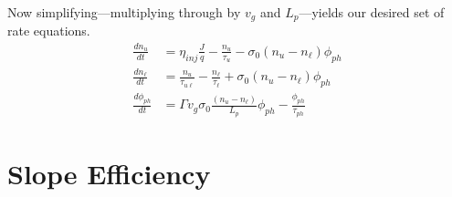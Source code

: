 \documentclass[12pt]{report}
\begin{document}
Now simplifying---multiplying through by $v_g$ and $L_p$---yields our desired set of rate equations.
\begin{subequations}
\label{chpt1eqn:req}
\begin{align}
\label{chpt1eqn:reqA}
\frac{d n_u}{dt}&=\eta_\textit{inj} \frac{J}{q}- \frac{n_u}{\tau_u}-\sigma_0 (n_u-n_\ell) \phi_{ph}\\
\label{chpt1eqn:reqB}
\frac{d n_\ell}{dt}&=\frac{n_u}{\tau_{u\ell}}- \frac{n_\ell}{\tau_\ell}+\sigma_0 (n_u-n_\ell) \phi_{ph}\\
\label{chpt1eqn:reqC}
\frac{d \phi_{ph}}{dt}&=\Gamma v_g \sigma_0 \frac{(n_u-n_\ell)}{L_p} \phi_{ph} - \frac{\phi_{ph}}{\tau_{ph}}
\end{align}
\end{subequations}


%
%
%
%
%

\section{Slope Efficiency}
\end{document}
